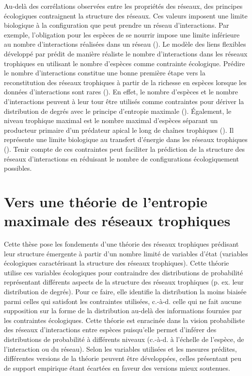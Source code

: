 Au-delà des corrélations observées entre les propriétés des réseaux, des
principes écologiques contraignent la structure des réseaux. Ces valeurs
imposent une limite biologique à la configuration que peut prendre un réseau
d'interactions. Par exemple, l'obligation pour les espèces de se nourrir impose
une limite inférieure au nombre d'interactions réalisées dans un réseau
(\cite{MacDonald2020Revisiting}). Le modèle des liens flexibles développé par
\cite{MacDonald2020Revisiting} prédit de manière réaliste le nombre
d'interactions dans les réseaux trophiques en utilisant le nombre d'espèces
comme contrainte écologique. Prédire le nombre d'interactions constitue une
bonne première étape vers la reconstitution des réseaux trophiques à partir de
la richesse en espèces lorsque les données d'interactions sont rares
(\cite{Strydom2021Roadmapa}). En effet, le nombre d'espèces et le nombre
d'interactions peuvent à leur tour être utilisés comme contraintes pour dériver
la distribution de degrés avec le principe d'entropie maximale
(\cite{Williams2011Biology}). Également, le niveau trophique maximal est le
nombre maximal d'espèces séparant un producteur primaire d'un prédateur apical
le long de chaînes trophiques (\cite{Cohen1978Food}). Il représente une limite
biologique au transfert d'énergie dans les réseaux trophiques
(\cite{Williams2004Limits}). Tenir compte de ces contraintes peut faciliter la
prédiction de la structure des réseaux d'interactions en réduisant le nombre de
configurations écologiquement possibles.  


\section{Vers une théorie de l'entropie maximale des réseaux trophiques}

Cette thèse pose les fondements d'une théorie des réseaux trophiques prédisant
leur structure émergente à partir d'un nombre limité de variables d'état
(variables écologiques caractérisant la structure des réseaux trophiques). Cette
théorie utilise ces variables écologiques pour contraindre des distributions de
probabilité représentant différents aspects de la structure des réseaux
trophiques (p. ex. leur distribution de degrés). Pour ce faire, elle identifie
la distribution la moins biaisée parmi celles qui satisfont les contraintes
utilisées, c.-à-d. celle qui ne fait aucune supposition sur la forme de la
distribution au-delà des informations fournies par les contraintes écologiques.
Cette théorie est enracinée dans la vision probabiliste des réseaux
d'interactions entre espèces puisqu'elle permet d'inférer des distributions de
probabilité à différents niveaux (c.-à-d. à l'échelle de l'espèce, de
l'interaction ou du réseau). Selon les variables utilisées et les mesures
prédites, différentes versions de la théorie peuvent être développées, celles
présentant peu de support empirique étant écartées en faveur des versions mieux
soutenues.

